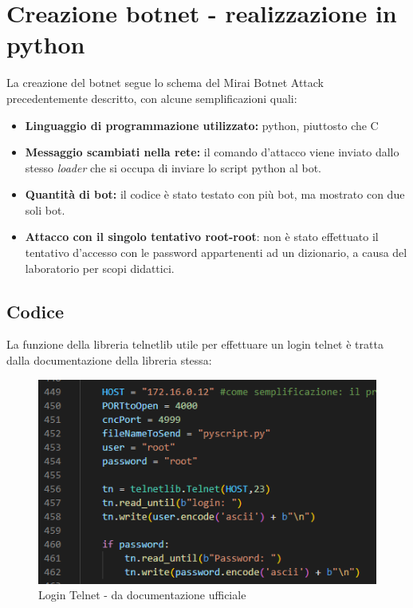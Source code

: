 \setcounter{secnumdepth}{5}



\chapter{Creazione botnet - realizzazione in python}
La creazione del botnet segue lo schema del Mirai Botnet Attack precedentemente descritto, con alcune semplificazioni quali:
\begin{itemize}
    \item \textbf{Linguaggio di programmazione utilizzato:} python, piuttosto che C
    \item \textbf{Messaggio scambiati nella rete:} il comando d'attacco viene inviato dallo stesso \textit{loader} che si occupa di inviare lo script python al bot. 
    \item \textbf{Quantità di bot:} il codice è stato testato con più bot, ma mostrato con due soli bot.
    \item \textbf{Attacco con il singolo tentativo root-root}: non è stato effettuato il tentativo d'accesso con le password appartenenti ad un dizionario, a causa del laboratorio per scopi didattici. 
\end{itemize}
\section{Codice}

La funzione della libreria telnetlib utile per effettuare un login telnet è tratta dalla documentazione della libreria stessa: 
\begin{figure}[H]
    \centering
    \includegraphics[scale=0.5]{UNINA_MSc_Thesis_Project/img/Codice/loginTelnet.png}
    \caption{Login Telnet - da documentazione ufficiale}
    \label{fig:my_label}
\end{figure}

